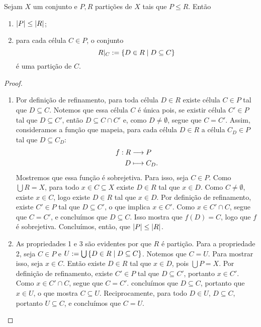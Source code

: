 \begin{prop}
Sejam $X$ um conjunto e $P,R$ partições de $X$ tais que $P \leq R$. Então
	\begin{enumerate}
	\item $\left\vert{P}\right\vert \leq \left\vert{R}\right\vert$;
	\item para cada célula $C \in P$, o conjunto
		\begin{equation*}
		R|_C := \left\{D \in R \;\middle\vert\; D \subseteq C \right\}
		\end{equation*}
é uma partição de $C$.
	\end{enumerate}
\end{prop}
\begin{proof}
	\begin{enumerate}
	\item Por definição de refinamento, para toda célula $D \in R$ existe célula $C \in P$ tal que $D \subseteq C$. Notemos que essa célula $C$ é única pois, se existir célula $C' \in P$ tal que $D \subseteq C'$, então $D \subseteq C \cap C'$ e, como $D \neq \emptyset$, segue que $C =C'$. Assim, consideramos a função que mapeia, para cada célula $D \in R$ a célula $C_D \in P$ tal que $D \subseteq C_D$:
	\begin{align*}
	{f}: {R} &\longrightarrow {P} \\{D} &\longmapsto {C_D}.
	\end{align*}
Mostremos que essa função é sobrejetiva. Para isso, seja $C \in P$. Como $\bigcup R = X$, para todo $x \in C \subseteq X$ existe $D \in R$ tal que $x \in D$. Como $C \neq \emptyset$, existe $x \in C$, logo existe $D \in R$ tal que $x \in D$. Por definição de refinamento, existe $C' \in P$ tal que $D \subseteq C'$, o que implica $x \in C'$. Como $x \in C' \cap C$, segue que $C=C'$, e concluímos que $D \subseteq C$. Isso mostra que $f(D)=C$, logo que $f$ é sobrejetiva. Concluímos, então, que $\left\vert{P}\right\vert \leq \left\vert{R}\right\vert$.
	
	\item As propriedades 1 e 3 são evidentes por que $R$ é partição. Para a propriedade 2, seja $C \in P$ e $U := \bigcup \left\{D \in R \;\middle\vert\; D \subseteq C \right\}$. Notemos que $C=U$. Para mostrar isso, seja $x \in C$. Então existe $D \in R$ tal que $x \in D$, pois $\bigcup P=X$. Por definição de refinamento, existe $C' \in P$ tal que $D \subseteq C'$, portanto $x \in C'$. Como $x \in C' \cap C$, segue que $C=C'$. concluímos que $D \subseteq C$, portanto que $x \in U$, o que mostra $C \subseteq U$. Reciprocamente, para todo $D \in U$, $D \subseteq C$, portanto $U \subseteq C$, e concluímos que $C=U$.
	\end{enumerate}
\end{proof}

